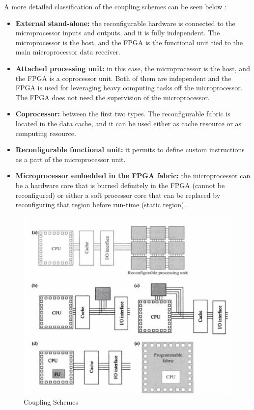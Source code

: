 \documentclass[twoside]{romjist}
\begin{document}
	A more detailed classification of the coupling schemes can be seen below \cite{3}:
	\begin{itemize}
		\item
		\textbf{External stand-alone:} the reconfigurable hardware is connected to the microprocessor
		inputs and outputs, and it is fully independent. The microprocessor is the host, and the
		FPGA is the functional unit tied to the main microprocessor data receiver.
		\item
		\textbf{Attached processing unit:} in this case, the microprocessor is the host, and the FPGA
		is a coprocessor unit. Both of them are independent and the FPGA is used for leveraging
		heavy computing tasks off the microprocessor. The FPGA does not need the
		supervision of the microprocessor.
		\item
		\textbf{Coprocessor:} between the first two types. The reconfigurable fabric is located in the
		data cache, and it can be used either as cache resource or as computing resource.
		\item
		\textbf{Reconfigurable functional unit:} it permits to define custom instructions as a part of the
		microprocessor unit.
		\item
		\textbf{Microprocessor embedded in the FPGA fabric:} the microprocessor can be a
		hardware core that is burned definitely in the FPGA (cannot be reconfigured) or either
		a soft processor core that can be replaced by reconfiguring that region before run-time
		(static region).
	\end{itemize}

	\begin{figure}[h]
		\centering
		\includegraphics[width=\textwidth]{fig_2_2}
		\caption{Coupling Schemes \cite{3}}
		\label{fig:figure22}
	\end{figure}
	
\end{document}

